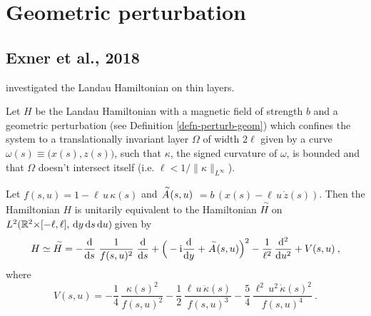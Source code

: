 


\section{Geometric perturbation}


\subsection{Exner et al., 2018}
\cite{Exner2018} investigated the Landau Hamiltonian on thin layers.

\begin{defn}
    Let $H\!$ be the Landau Hamiltonian with a magnetic field of strength $b$ and a geometric perturbation (see Definition \ref{defn-perturb-geom}) which confines the system to a translationally invariant layer $\Omega$ of width $2\ell$ given by a curve $\omega(s) \equiv \big(x(s),z(s)\big)$, such that $\kappa$, the signed curvature of $\omega$, is bounded and that $\Omega$ doesn't intersect itself (i.e. $\ell < 1/\lVert\kappa\rVert_{L^\infty}$).
\end{defn}

\begin{thm}
    Let $f(s,u) = 1 - \ell \, u \, \kappa(s)$ and $\overset{\;\,\scriptscriptstyle\sim}{A}(s,u) $ $ = b \,(x(s) - \ell \, u \, \dot z(s))$. Then the Hamiltonian $H\!$ is unitarily equivalent to the Hamiltonian $\overset{\;\,\scriptscriptstyle\sim}{H}\!$ on $L^2(\mathbb{R}^2 {\times} [-\ell, \ell], \, \mathrm{d}y \,\!\, \mathrm{d}s \,\!\, \mathrm{d}u \,\!)\!$ given by
    \begin{equation*}
        H \simeq \overset{\;\,\scriptscriptstyle\sim}{H}
        = - \frac{\mathrm{d} }{\mathrm{d} s} \; \frac{1}{f(s,u)^2} \; \frac{\mathrm{d} }{\mathrm{d} s}
        +  \Big( - \mathrm{i} \frac{\mathrm{d} }{\mathrm{d} y} + \overset{\;\,\scriptscriptstyle\sim}{A}(s,u) \Big)^2
        - \frac{1}{\ell^2} \, \frac{\mathrm{d} ^2}{\mathrm{d} u^2}
        + V(s,u)
        \: ,
    \end{equation*}
    where
    \begin{equation*}
        V(s,u)
        = -\frac{1}{4} \, \frac{\kappa(s)^2}{f(s,u)^2}
        - \frac{1}{2} \, \frac{\ell \, u \, \ddot\kappa(s)}{f(s,u)^3}
        - \frac{5}{4} \, \frac{\ell^2 \, u^2 \, \dot\kappa(s)^2}{f(s,u)^4}
        \: .
    \end{equation*}
\end{thm}

